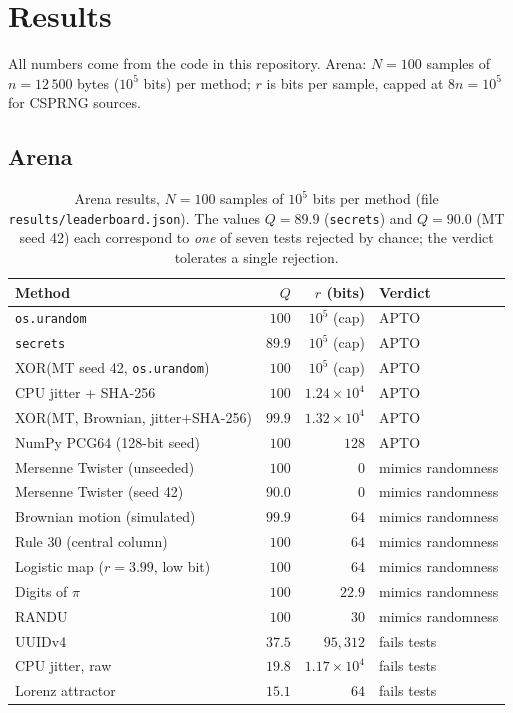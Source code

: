\documentclass[11pt,a4paper]{article}
\theoremstyle{plain}
\theoremstyle{definition}
\begin{document}
\section{Results}\label{sec:results}

All numbers come from the code in this repository. Arena: $N=100$ samples of
$n=12\,500$ bytes ($10^5$ bits) per method; $r$ is bits per sample, capped at
$8n=10^5$ for CSPRNG sources.

\subsection{Arena}

\begin{table}[H]
\centering\small
\begin{tabular}{@{}lrrl@{}}
\toprule
Method & $Q$ & $r$ (bits) & Verdict \\
\midrule
\texttt{os.urandom} & $100$ & $10^5$ (cap) & APTO \\
\texttt{secrets} & $89.9$ & $10^5$ (cap) & APTO \\
XOR(MT seed 42, \texttt{os.urandom}) & $100$ & $10^5$ (cap) & APTO \\
CPU jitter + SHA-256 & $100$ & $1.24{\times}10^{4}$ & APTO \\
XOR(MT, Brownian, jitter+SHA-256) & $99.9$ & $1.32{\times}10^{4}$ & APTO \\
NumPy PCG64 (128-bit seed) & $100$ & $128$ & APTO \\
Mersenne Twister (unseeded) & $100$ & $0$ & mimics randomness \\
Mersenne Twister (seed 42) & $90.0$ & $0$ & mimics randomness \\
Brownian motion (simulated) & $99.9$ & $64$ & mimics randomness \\
Rule 30 (central column) & $100$ & $64$ & mimics randomness \\
Logistic map ($r=3.99$, low bit) & $100$ & $64$ & mimics randomness \\
Digits of $\pi$ & $100$ & $22.9$ & mimics randomness \\
RANDU & $100$ & $30$ & mimics randomness \\
UUIDv4 & $37.5$ & $95{,}312$ & fails tests \\
CPU jitter, raw & $19.8$ & $1.17{\times}10^{4}$ & fails tests \\
Lorenz attractor & $15.1$ & $64$ & fails tests \\
\bottomrule
\end{tabular}
\caption{Arena results, $N=100$ samples of $10^5$ bits per method (file
\texttt{results/leaderboard.json}). The values $Q=89.9$ (\texttt{secrets}) and
$Q=90.0$ (MT seed 42) each correspond to \emph{one} of seven tests rejected by
chance; the verdict tolerates a single rejection.}
\end{table}
\end{document}
